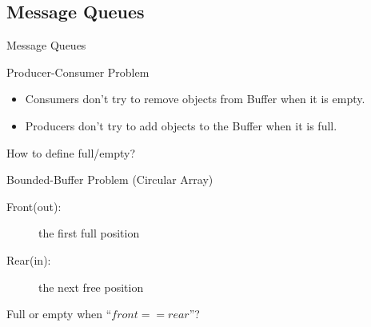 \subsection{Message Queues}
\label{sec:message-queues}

\begin{frame}{Message Queues}
  \begin{center}
    \begin{minipage}{.3\linewidth}
      \begin{center}
      \end{center}
    \end{minipage}\qquad
    \begin{minipage}{.3\linewidth}
    \end{minipage}
  \end{center}
\end{frame}

\begin{frame}{Producer-Consumer Problem}
  \begin{itemize}
  \item Consumers don't try to remove objects from Buffer when it is empty.
  \item Producers don't try to add objects to the Buffer when it is full.
  \end{itemize}
  \begin{center}
  \end{center}
  \begin{center}
    How to define \alert{full/empty}?
  \end{center}
\end{frame}

\begin{frame}{Bounded-Buffer Problem (Circular Array)}
  \begin{minipage}{.65\linewidth}
  \begin{description}
  \item[Front(out):] the first full position
  \item[Rear(in):] the next free position
  \end{description}
  \end{minipage}\quad
  \begin{minipage}{.3\linewidth}
  \end{minipage}
  Full or empty when ``$front == rear$''?
\end{frame}

